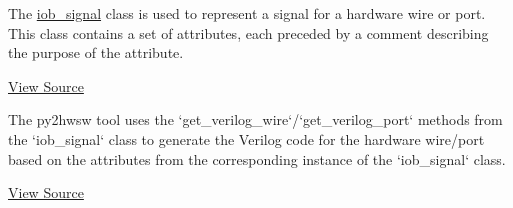 %

%
%

The \href{https://github.com/IObundle/py2hwsw/blob/main/py2hwsw/scripts/iob_signal.py}{iob\_signal} class is used to represent a signal for a hardware wire or port.
This class contains a set of attributes, each preceded by a comment describing the purpose of the attribute.

\href{https://github.com/IObundle/py2hwsw/blob/main/py2hwsw/scripts/iob_signal.py}{View Source}

%
%

The py2hwsw tool uses the `get\_verilog\_wire`/`get\_verilog\_port` methods from the `iob\_signal` class to generate the Verilog code for the hardware wire/port based on the attributes from the corresponding instance of the `iob\_signal` class.

\href{https://github.com/IObundle/py2hwsw/blob/main/py2hwsw/scripts/iob_signal.py}{View Source}
